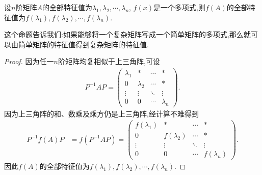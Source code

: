 \documentclass[../../main.tex]{subfiles}%
\begin{document}
\begin{proposition}\label{proposition:矩阵多项式的特征值就是原特征值代入多项式得到的数}
设$n$阶矩阵$A$的全部特征值为$\lambda_1, \lambda_2, \cdots, \lambda_n$, $f(x)$是一个多项式,则$f(A)$的全部特征值为$f(\lambda_1), f(\lambda_2), \cdots, f(\lambda_n)$.
\end{proposition}
\begin{remark}
这个命题告诉我们:如果能够将一个复杂矩阵写成一个简单矩阵的多项式,那么就可以由简单矩阵的特征值得到复杂矩阵的特征值.
\end{remark}
\begin{proof}
因为任一$n$阶矩阵均复相似于上三角阵,可设
\begin{align*}
P^{-1}AP = \begin{pmatrix}
\lambda_1 & * & \cdots & * \\
0 & \lambda_2 & \cdots & * \\
\vdots & \vdots & \ddots & \vdots \\
0 & 0 & \cdots & \lambda_n
\end{pmatrix}.
\end{align*}
因为上三角阵的和、数乘及乘方仍是上三角阵,经计算不难得到
\begin{align*}
P^{-1}f(A)P &= f(P^{-1}AP) = \begin{pmatrix}
f(\lambda_1) & * & \cdots & * \\
0 & f(\lambda_2) & \cdots & * \\
\vdots & \vdots & \ddots & \vdots \\
0 & 0 & \cdots & f(\lambda_n)
\end{pmatrix}.
\end{align*}
因此$f(A)$的全部特征值为$f(\lambda_1), f(\lambda_2), \cdots, f(\lambda_n)$.
\end{proof}
\end{document}
